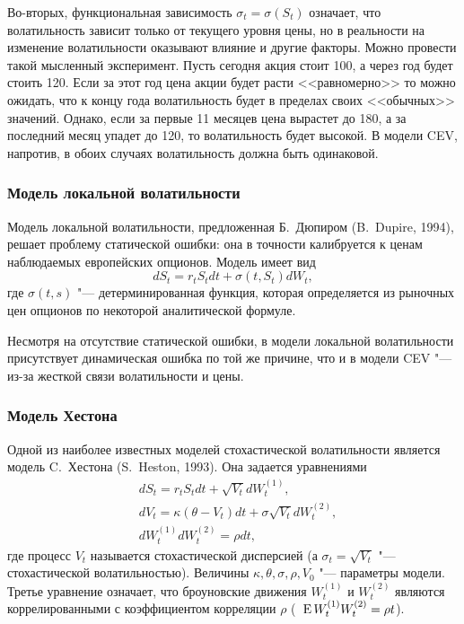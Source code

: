 Во-вторых, функциональная зависимость $\sigma_t=\sigma(S_t)$ означает, что волатильность зависит только от текущего уровня цены, но в реальности на изменение волатильности оказывают влияние и другие факторы.
Можно провести такой мысленный эксперимент.
Пусть сегодня акция стоит 100, а через год будет стоить 120.
Если за этот год цена акции будет расти <<равномерно>> то можно ожидать, что к концу года волатильность будет в пределах своих <<обычных>> значений.
Однако, если за первые 11 месяцев цена вырастет до 180, а за последний месяц упадет до 120, то волатильность будет высокой. 
В модели CEV, напротив, в обоих случаях волатильность должна быть одинаковой.


\subsubsection{Модель локальной волатильности}

Модель локальной волатильности, предложенная Б.~Дюпиром (B.~Dupire, 1994), решает проблему статической ошибки: она в точности калибруется к ценам наблюдаемых европейских опционов.
Модель имеет вид
\[
d S_t = r_tS_t dt + \sigma(t,S_t) d W_t,
\]
где $\sigma(t,s)$ "--- детерминированная функция, которая определяется из рыночных цен опционов по некоторой аналитической формуле.

Несмотря на отсутствие статической ошибки, в модели локальной волатильности присутствует динамическая ошибка по той же причине, что и в модели CEV "--- из-за жесткой связи волатильности и цены.


\subsubsection{Модель Хестона}
Одной из наиболее известных моделей стохастической волатильности является модель C.~Хестона (S.~Heston, 1993).
Она задается уравнениями
\begin{align*}
&d S_t = r_tS_tdt + \sqrt{V_t} d W_t^{(1)},\\
&d V_t = \kappa(\theta - V_t)dt + \sigma \sqrt{V_t} d W_t^{(2)},\\
&d W_t^{(1)} d W_t^{(2)} = \rho dt,
\end{align*}
где процесс $V_t$ называется стохастической дисперсией (а $\sigma_t = \sqrt{V_t}$ "--- стохастической волатильностью).
Величины $\kappa,\theta,\sigma,\rho, V_0$ "--- параметры модели.
Третье уравнение означает, что броуновские движения $W_t^{(1)}$ и $W_t^{(2)}$ являются коррелированными с коэффициентом корреляции $\rho$ (\te\ $\operatorname{E} W_t^{(1)}W_t^{(2)} = \rho t$).

